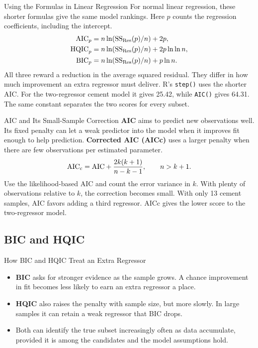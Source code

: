 \begin{frame}{Using the Formulas in Linear Regression}
    For normal linear regression, these shorter formulas give the same model rankings. Here $p$ counts the regression coefficients, including the intercept.
    \[
    \begin{aligned}
        \mathrm{AIC}_p  &= n\ln(\mathrm{SS}_{\mathrm{Res}}(p)/n)+2p,\\
        \mathrm{HQIC}_p &= n\ln(\mathrm{SS}_{\mathrm{Res}}(p)/n)+2p\ln\ln n,\\
        \mathrm{BIC}_p  &= n\ln(\mathrm{SS}_{\mathrm{Res}}(p)/n)+p\ln n .
    \end{aligned}
    \]
    All three reward a reduction in the average squared residual. They differ in how much improvement an extra regressor must deliver.
    \svspace{0.4em}
    R's \texttt{step()} uses the shorter AIC. For the two-regressor cement model it gives 25.42, while \texttt{AIC()} gives 64.31. The same constant separates the two scores for every subset.
\end{frame}


\begin{frame}{AIC and Its Small-Sample Correction}
    \textbf{AIC} aims to predict new observations well. Its fixed penalty can let a weak predictor into the model when it improves fit enough to help prediction.
    \svspace{0.5em}
    \textbf{Corrected AIC (AICc)} uses a larger penalty when there are few observations per estimated parameter.
    \[
    \mathrm{AIC}_{c}=\mathrm{AIC}+\frac{2k(k+1)}{n-k-1},\qquad n>k+1 .
    \]
    Use the likelihood-based AIC and count the error variance in $k$. With plenty of observations relative to $k$, the correction becomes small.
    \svspace{0.5em}
    With only 13 cement samples, AIC favors adding a third regressor. AICc gives the lower score to the two-regressor model.
\end{frame}


\subsection{BIC and HQIC}


\begin{frame}{How BIC and HQIC Treat an Extra Regressor}
    \begin{itemize}
        \item \textbf{BIC} asks for stronger evidence as the sample grows. A chance improvement in fit becomes less likely to earn an extra regressor a place.
        \item \textbf{HQIC} also raises the penalty with sample size, but more slowly. In large samples it can retain a weak regressor that BIC drops.
        \item Both can identify the true subset increasingly often as data accumulate, provided it is among the candidates and the model assumptions hold.
    \end{itemize}
\end{frame}


